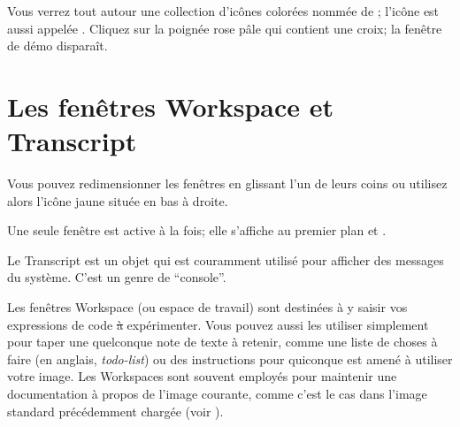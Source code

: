 \documentclass[a4paper,10pt,twoside]{book}
\begin{document}
Vous verrez tout autour une collection d'icônes  colorées
nommée %
 de \bam; l'icône
 est aussi appelée .
Cliquez sur la poignée rose pâle qui contient une croix; la fenêtre
de démo disparaît. %

\section{Les fenêtres Workspace et Transcript}

Vous pouvez redimensionner les fenêtres en glissant l'un de leurs
coins ou  utilisez alors l'icône jaune située en bas à droite.

Une seule fenêtre est active à la fois; elle s'affiche au premier plan
et . %

Le Transcript est un objet qui est couramment utilisé pour afficher
des messages du système. C'est un genre de ``console''.

Les fenêtres Workspace (ou espace de travail) sont destinées à
y saisir vos expressions de code \st à expérimenter.
Vous pouvez aussi les utiliser simplement pour taper une quelconque
note de texte à retenir, comme une liste de choses à faire (en
anglais, \emph{todo-list}) ou des instructions pour quiconque est
amené à utiliser votre image.
Les Workspaces sont souvent employés pour maintenir une
documentation à propos de l'image courante, comme c'est le cas
dans l'image standard précédemment chargée (voir
).
\end{document}
